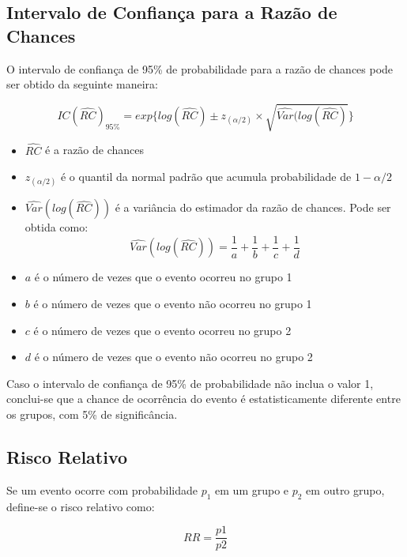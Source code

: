 \documentclass[
  portuguese,
]{estat/estat}
\begin{document}
\subsection{Intervalo de Confiança para a Razão de
Chances}\label{intervalo-de-confianuxe7a-para-a-razuxe3o-de-chances}

\par O intervalo de confiança de 95\% de probabilidade para a razão de chances pode ser obtido da seguinte maneira:

$$IC(\hat{RC})_{95\%}=exp\{log(\hat{RC})\pm z_{(\alpha/2)}\times\sqrt{\hat{Var}(log(\hat{RC})}\}$$

\begin{itemize}

    \item $\hat{RC}$ é a razão de chances
    \item $z_{(\alpha/2)}$ é o quantil da normal padrão que acumula probabilidade de $1-\alpha/2$
    \item $\hat{Var}(log(\hat{RC}))$ é a variância do estimador da razão de chances. Pode ser obtida como:
    $$\hat{Var}(log(\hat{RC}))=\frac{1}{a}+\frac{1}{b}+\frac{1}{c}+\frac{1}{d}$$
    
    \item $a$ é o número de vezes que o evento ocorreu no grupo 1
    \item $b$ é o número de vezes que o evento não ocorreu no grupo 1
    \item $c$ é o número de vezes que o evento ocorreu no grupo 2
    \item $d$ é o número de vezes que o evento não ocorreu no grupo 2
    
\end{itemize}

\par Caso o intervalo de confiança de 95\% de probabilidade não inclua o valor 1, conclui-se que a chance de ocorrência do evento é estatisticamente diferente entre os grupos, com 5\% de significância.

\subsection{Risco Relativo}\label{risco-relativo}

\par Se um evento ocorre com probabilidade $p_1$ em um grupo e $p_2$ em outro grupo, define-se o risco relativo como:

$$RR=\frac{p1}{p2}$$
\end{document}
